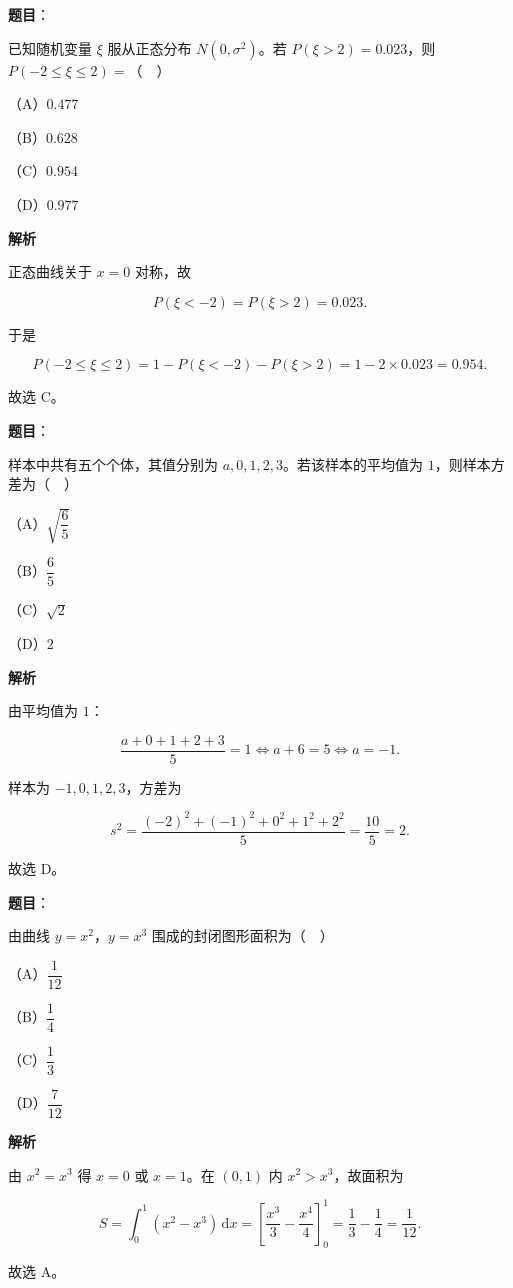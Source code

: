 \begin{answer}

\textbf{题目}：

已知随机变量 $\xi$ 服从正态分布 $N(0,\sigma^2)$。若 $P(\xi>2)=0.023$，则 $P(-2\leqslant\xi\leqslant2)=$（　）

（A）$0.477$

（B）$0.628$

（C）$0.954$

（D）$0.977$

\textbf{解析}

正态曲线关于 $x=0$ 对称，故

\nopagebreak[4]
\[P(\xi<-2)=P(\xi>2)=0.023.\]

于是

\nopagebreak[4]
\[P(-2\leqslant\xi\leqslant2)=1-P(\xi<-2)-P(\xi>2)
=1-2\times0.023=0.954.\]

故选 C。


\end{answer}
\begin{answer}

\textbf{题目}：

样本中共有五个个体，其值分别为 $a,0,1,2,3$。若该样本的平均值为 $1$，则样本方差为（　）

（A）$\sqrt{\dfrac65}$

（B）$\dfrac65$

（C）$\sqrt2$

（D）$2$

\textbf{解析}

由平均值为 $1$：

\nopagebreak[4]
\[\frac{a+0+1+2+3}{5}=1\iff a+6=5\iff a=-1.\]

样本为 $-1,0,1,2,3$，方差为

\nopagebreak[4]
\[s^2=\frac{(-2)^2+(-1)^2+0^2+1^2+2^2}{5}
=\frac{10}{5}=2.\]

故选 D。


\end{answer}
\begin{answer}

\textbf{题目}：

由曲线 $y=x^2$，$y=x^3$ 围成的封闭图形面积为（　）

（A）$\dfrac1{12}$

（B）$\dfrac14$

（C）$\dfrac13$

（D）$\dfrac7{12}$

\textbf{解析}

由 $x^2=x^3$ 得 $x=0$ 或 $x=1$。在 $(0,1)$ 内 $x^2>x^3$，故面积为

\nopagebreak[4]
\[S=\int_0^1(x^2-x^3)\,\mathrm dx
=\left[\frac{x^3}{3}-\frac{x^4}{4}\right]_0^1
=\frac13-\frac14=\frac1{12}.\]

故选 A。


\end{answer}
